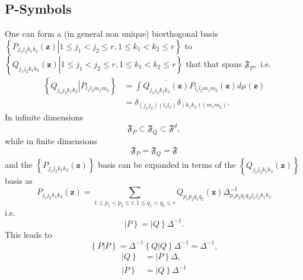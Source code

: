 \documentclass[aps,preprint]{revtex4}%
\begin{document}
\subsection{P-Symbols}

One can form a (in general non unique) biorthogonal basis $\left\{  \left.
P_{j_{1}j_{2}k_{1}k_{2}}\left(  \mathbf{z}\right)  \right\vert 1\leq
j_{1}<j_{2}\leq r,1\leq k_{1}<k_{2}\leq r\right\}  $ to $\left\{  \left.
Q_{j_{1}j_{2}k_{1}k_{2}}\left(  \mathbf{z}\right)  \right\vert 1\leq
j_{1}<j_{2}\leq r,1\leq k_{1}<k_{2}\leq r\right\}  $ that that spans
$\mathfrak{F}_{P},$ i.e.
\begin{align}
\left\{  Q_{j_{1}j_{2}k_{1}k_{2}}\left\vert P_{l_{1}l_{2}m_{1}m_{2}}\right.
\right\}   &  =\int\overline{Q_{j_{1}j_{2}k_{1}k_{2}}\left(  \mathbf{z}%
\right)  }P_{l_{1}l_{2}m_{1}m_{2}}\left(  \mathbf{z}\right)  d\mu\left(
\mathbf{z}\right) \nonumber\\
&  =\delta_{\left(  j_{1}j_{2}\right)  \left(  l_{1}l_{2}\right)  }%
\delta_{\left(  k_{1}k_{2}\right)  \left(  m_{1}m_{2}\right)  }.
\end{align}
In infinite dimensions
\begin{equation}
\mathfrak{F}_{P}\subset\mathfrak{F}_{Q}\subset\mathfrak{F}^{d},
\end{equation}
while in finite dimensions
\begin{equation}
\mathfrak{F}_{P}=\mathfrak{F}_{Q}=\mathfrak{F}%
\end{equation}
and the $\left\{  P_{j_{1}j_{2}k_{1}k_{2}}\left(  \mathbf{z}\right)  \right\}
$ basis can be expanded in terms of the $\left\{  Q_{j_{1}j_{2}k_{1}k_{2}%
}\left(  \mathbf{z}\right)  \right\}  $ basis as
\begin{equation}
P_{j_{1}j_{2}k_{1}k_{2}}\left(  \mathbf{z}\right)  =\sum_{1\leq p_{1}%
<p_{2}\leq r,1\leq q_{1}<q_{2}\leq r}Q_{p_{1}p_{2}q_{1}q_{2}}\left(
\mathbf{z}\right)  \Delta_{p_{1}p_{2}q_{1}q_{2}j_{1}j_{2}k_{1}k_{2}}%
^{-1}\nonumber
\end{equation}
i.e.
\begin{equation}
\left\vert P\right\}  =\left\vert Q\right\}  \Delta^{-1}.
\end{equation}
This leads to%
\begin{equation}
\left\{  \left.  P\right\vert P\right\}  =\Delta^{-1}\left\{  \left.
Q\right\vert Q\right\}  \Delta^{-1}=\Delta^{-1},
\end{equation}%
\begin{align}
\left\vert Q\right\}   &  =\left\vert P\right\}  \Delta,\nonumber\\
\left\vert P\right\}   &  =\left\vert Q\right\}  \Delta^{-1}%
\end{align}
\end{document}
